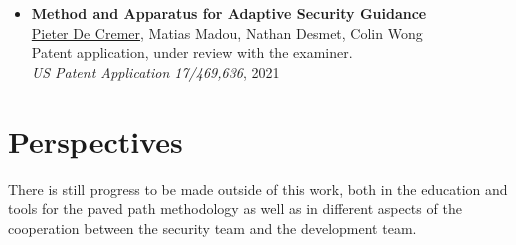 {\begin{itemize}
    \underline{Pieter De Cremer}, Matias Madou, Nathan Desmet, Colin Wong\\
    Patent application, under review with the examiner.\\
    \emph{US Patent Application 17/005,729}, 2020
    \item 
    \textbf{Method and Apparatus for Adaptive Security Guidance}\\
    \underline{Pieter De Cremer}, Matias Madou, Nathan Desmet, Colin Wong\\
    Patent application, under review with the examiner.\\
    \emph{US Patent Application 17/469,636}, 2021
\end{itemize}
}

%
%
%
%

\section{Perspectives}
There is still progress to be made outside of this work, both in the education and tools for the paved path methodology as well as in different aspects of the cooperation between the security team and the development team.


